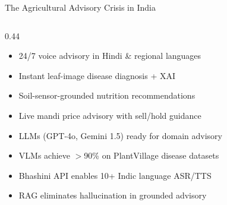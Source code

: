 \documentclass[aspectratio=169, 10pt]{beamer}
\begin{document}
\begin{frame}{The Agricultural Advisory Crisis in India}
\begin{columns}[T]
    \begin{column}{0.44\textwidth}
      \begin{tcolorbox}[agricard=Purple, title=What AI can offer, before skip=0pt, top=3pt, bottom=3pt]
        \footnotesize
        \begin{itemize}[leftmargin=1em, itemsep=0.5pt, topsep=0.5pt]
          \item[$\rightarrow$] 24/7 voice advisory in Hindi \& regional languages
          \item[$\rightarrow$] Instant leaf-image disease diagnosis + XAI
          \item[$\rightarrow$] Soil-sensor-grounded nutrition recommendations
          \item[$\rightarrow$] Live mandi price advisory with sell/hold guidance
        \end{itemize}
      \end{tcolorbox}
      \vspace{2pt}
      \begin{tcolorbox}[agricard=Teal, title=Why now?, before skip=0pt, top=3pt, bottom=3pt]
        \footnotesize
        \begin{itemize}[leftmargin=1em, itemsep=0.5pt, topsep=0.5pt]
          \item[$\rightarrow$] LLMs (GPT-4o, Gemini 1.5) ready for domain advisory
          \item[$\rightarrow$] VLMs achieve $>$90\% on PlantVillage disease datasets
          \item[$\rightarrow$] Bhashini API enables 10+ Indic language ASR/TTS
          \item[$\rightarrow$] RAG eliminates hallucination in grounded advisory
        \end{itemize}
      \end{tcolorbox}
    \end{column}
  \end{columns}
\end{frame}
\end{document}
